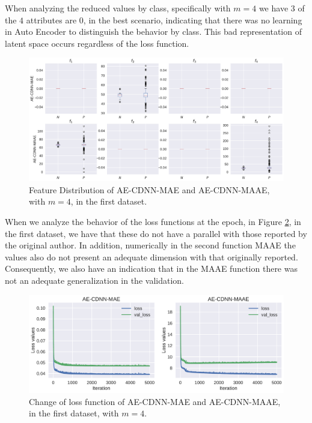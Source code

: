 



When analyzing the reduced values by class, specifically with $m = 4$ we have $3$ of the $4$ attributes are $0$, in the best scenario, indicating that there was no learning in Auto Encoder to distinguish the behavior by class. This bad representation of latent space occurs regardless of the loss function.


\begin{figure}[!ht]
\centering
\includegraphics[width=0.8\linewidth]{figure/feature_distribution_4.pdf}
  \caption{Feature Distribution of AE-CDNN-MAE and AE-CDNN-MAAE, with $m=4$, in the first dataset. }
\label{fig:feature_distribution_4}
\end{figure}

\newpage

When we analyze the behavior of the loss functions at the epoch, in Figure \ref{fig:change_loss_mae_maae}, in the first dataset, we have that these do not have a parallel with those reported by the original author. In addition, numerically in the second function MAAE the values also do not present an adequate dimension with that originally reported. Consequently, we also have an indication that in the MAAE function there was not an adequate generalization in the validation.


\begin{figure}[!ht]
\centering
\includegraphics[width=0.8\linewidth]{figure/change_loss_mae_maae.pdf}
  \caption{Change of loss function of AE-CDNN-MAE and AE-CDNN-MAAE, in the first dataset, with $m=4$.}
\label{fig:change_loss_mae_maae}
\end{figure}


